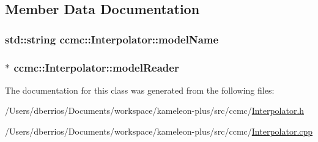 \subsection{Member Data Documentation}
\hypertarget{classccmc_1_1_interpolator_a7b86407984c4ce59643b926064bdb364}{
\subsubsection[{model\-Name}]{\setlength{\rightskip}{0pt plus 5cm}std\-::string ccmc\-::\-Interpolator\-::model\-Name\hspace{0.3cm}{\ttfamily [protected]}}}\label{classccmc_1_1_interpolator_a7b86407984c4ce59643b926064bdb364}
\hypertarget{classccmc_1_1_interpolator_afee5bb61e5d5a0a7b9152c6f74378c4a}{
\subsubsection[{model\-Reader}]{$\ast$ ccmc\-::\-Interpolator\-::model\-Reader\hspace{0.3cm}{\ttfamily [protected]}}}\label{classccmc_1_1_interpolator_afee5bb61e5d5a0a7b9152c6f74378c4a}


The documentation for this class was generated from the following files\-:\begin{DoxyCompactItemize}
\item 
/\-Users/dberrios/\-Documents/workspace/kameleon-\/plus/src/ccmc/\hyperlink{_interpolator_8h}{Interpolator.\-h}\item 
/\-Users/dberrios/\-Documents/workspace/kameleon-\/plus/src/ccmc/\hyperlink{_interpolator_8cpp}{Interpolator.\-cpp}\end{DoxyCompactItemize}
